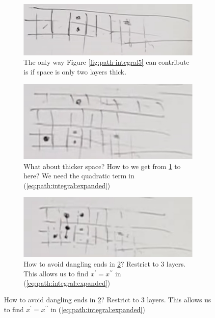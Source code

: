 \documentclass[]{article}
\begin{document}
\begin{figure}[H]
\begin{subfigure}{0.45\textwidth}
	\end{subfigure}
	\begin{subfigure}{0.45\textwidth}
		\caption{The only way Figure \ref{fig:path-integral5} can contribute is if space is only two layers thick.}\label{fig:path-integral6}
		\includegraphics[width=1.0\textwidth]{path-integral6}
	\end{subfigure}
	\begin{subfigure}{0.45\textwidth}
		\caption{What about thicker space? How to we get from \ref{fig:path-integral6} to here? We need the quadratic term in (\ref{eq:path:integral:expanded})}\label{fig:path-integral7}
		\includegraphics[width=1.0\textwidth]{path-integral7}
	\end{subfigure}
	\begin{subfigure}{0.45\textwidth}
		\caption{How to avoid dangling ends in \ref{fig:path-integral7}? Restrict to 3 layers. This allows us to find $x^\prime=x^{\prime\prime}$ in (\ref{eq:path:integral:expanded})}\label{fig:path-integral8}
		\includegraphics[width=1.0\textwidth]{path-integral8}
	\end{subfigure}

\end{figure}
\end{document}
